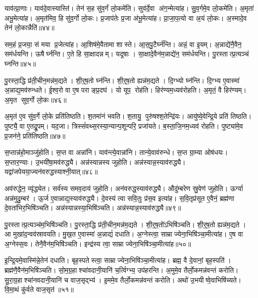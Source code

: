 याव॑त्प्रा॒णाः। याव॑दे॒वास्यास्ति॑। तेन॑ स॒ह सु॑व॒र्गं लो॒कमे॑ति। सुव॑र्दे॒वा अ॑ग॒न्मेत्या॑ह। सु॒व॒र्गमे॒व लो॒कमे॑ति। अ॒मृता॑ अभू॒मेत्या॑ह। अ॒मृत॑मिव॒ हि सु॑व॒र्गो लो॒कः। प्र॒जाप॑तेः प्र॒जा अ॑भू॒मेत्या॑ह। प्रा॒जा॒प॒त्यो वा अ॒यं लो॒कः। अ॒स्मादे॒व तेन॑ लो॒कान्नैति॑॥४४॥

सम॒हं प्र॒जया॒ सं मया प्र॒जेत्या॑ह। आ॒शिष॑मे॒वैतामा शास्ते। आ॒स॒पु॒टैर्घ्न॑न्ति। अन्नं॒ वा इ॒यम्। अ॒न्नाद्ये॑नै॒वैन॒ सम॑र्धयन्ति। ऊषैर्घ्नन्ति। ए॒ते हि सा॒क्षादन्नम्। यदूषाः। सा॒क्षादे॒वैन॑म॒न्नाद्ये॑न॒ सम॑र्धयन्ति। पु॒रस्तात्प्र॒त्यञ्चं घ्नन्ति॥४५॥

पु॒रस्ता॒द्धि प्र॑ती॒चीन॒मन्न॑म॒द्यते। शी॒र्॒ष॒तो घ्न॑न्ति। शी॒र्॒ष॒तो ह्यन्न॑म॒द्यते। दि॒ग्भ्यो घ्न॑न्ति। दि॒ग्भ्य ए॒वास्मा॑ अ॒न्नाद्य॒मव॑रुन्धते। ई॒श्व॒रो वा ए॒ष पराङ्प्र॒दघ॑। यो यूप॒ रोह॑ति। हिर॑ण्यम॒ध्यव॑रोहति। अ॒मृतं॒ वै हिर॑ण्यम्। अ॒मृत सुव॒र्गो लो॒कः॥४६॥

अ॒मृत॑ ए॒व सु॑व॒र्गे लो॒के प्रति॑तिष्ठति। श॒तमा॑नं भवति। श॒तायु॒ पुरु॑षश्श॒तेन्द्रि॑यः। आयु॑ष्ये॒वेन्द्रि॒ये प्रति॑ तिष्ठति। पुष्ट्यै॒ वा ए॒तद्रू॒पम्। यद॒जा। त्रिस्सं॑वथ्स॒रस्या॒न्यान्प॒शून्परि॒ प्रजा॑यते। ब॒स्ता॒जि॒नम॒ध्यव॑ रोहति। पुष्ट्या॑मे॒व प्र॒जन॑ने॒ प्रति॑तिष्ठति॥४७॥\anuvakamend[प॒रि॒धा॒पय॑ति गो॒धूमा॑ जुहोति॒ स्वं नैति॑ प्र॒त्यञ्चं घ्नन्ति लो॒को नव॑ च]

स॒प्तान्न॑हो॒माञ्जु॑होति। स॒प्त वा अन्ना॑नि। याव॑न्त्ये॒वान्ना॑नि। तान्ये॒वाव॑रुन्धे। स॒प्त ग्रा॒म्या ओष॑धयः। स॒प्तार॒ण्याः। उ॒भयी॑षा॒मव॑रुद्ध्यै। अन्न॑स्यान्नस्य जुहोति। अन्न॑स्यान्न॒स्याव॑रुद्ध्यै। यद्वा॑जपेयया॒ज्यन॑वरुद्धस्याश्नी॒यात्॥४८॥

अव॑रुद्धेन॒ व्यृ॑द्ध्येत। सर्व॑स्य समव॒दाय॑ जुहोति। अन॑वरुद्ध॒स्याव॑रुद्ध्यै। औदु॑म्बरेण स्रु॒वेण॑ जुहोति। ऊर्ग्वा अन्न॑मुदु॒म्बर॑। ऊ॒र्ज ए॒वान्नाद्य॒स्याव॑रुद्ध्यै। दे॒वस्य॑ त्वा सवि॒तुः प्र॑स॒व इत्या॑ह। स॒वि॒तृप्र॑सूत ए॒वैनं॒ ब्रह्म॑णा दे॒वता॑भिर॒भिषि॑ञ्चति। अन्न॑स्यान्नस्या॒भिषि॑ञ्चति। अन्न॑स्यान्न॒स्याव॑रुद्ध्यै॥४९॥

पु॒रस्तात्प्र॒त्यञ्च॑म॒भिषि॑ञ्चति। पु॒रस्ता॒द्धि प्र॑ती॒चीन॒मन्न॑म॒द्यते। शी॒र्॒ष॒तो॑ऽभिषि॑ञ्चति। शी॒र्॒ष॒तो ह्यन्न॑म॒द्यते। आ मुखा॑द॒न्वव॑स्रावयति। मु॒ख॒त ए॒वास्मा॑ अ॒न्नाद्यं॑ दधाति। अ॒ग्नेस्त्वा॒ साम्राज्येना॒भिषि॑ञ्चा॒मीत्या॑ह। ए॒ष वा अ॒ग्नेस्स॒वः। तेनै॒वैन॑म॒भिषि॑ञ्चति। इन्द्र॑स्य त्वा॒ साम्राज्येना॒भिषि॑ञ्चा॒मीत्या॑ह॥५०॥

इ॒न्द्रि॒यमे॒वास्मि॑न्ने॒तेन॑ दधाति। बृह॒स्पतेस्त्वा॒ साम्राज्येना॒भिषि॑ञ्चा॒मीत्या॑ह। ब्रह्म॒ वै दे॒वानां॒ बृह॒स्पति॑। ब्रह्म॑णै॒वैन॑म॒भिषि॑ञ्चति। सो॒म॒ग्र॒हाश्चा॑वदानी॒यानि॑ च॒र्त्विग्भ्य॒ उप॑हरन्ति। अ॒मुमे॒व तैर्लो॒कमन्न॑वन्तं करोति। सु॒रा॒ग्र॒हाश्चा॑नवदानी॒यानि॑ च वाज॒सृद्भ्य॑। इ॒ममे॒व तैर्लो॒कमन्न॑वन्तं करोति। अथो॑ उ॒भयीष्वे॒वाभिषि॑च्यते। वि॒मा॒थं कु॑र्वते वाज॒सृत॑॥५१॥


